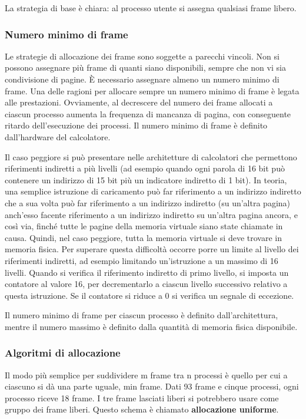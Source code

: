 \documentclass[11pt,a4paper]{article}
\begin{document}
La strategia di base è chiara: al processo utente si assegna qualsiasi frame libero.

\subsubsection{Numero minimo di frame}
Le strategie di allocazione dei frame sono soggette a parecchi vincoli. Non si possono asse­gnare più frame di quanti siano disponibili, sempre che non vi sia condivisione di pagine. È necessario assegnare almeno un numero minimo di frame.
Una delle ragioni per allocare sempre un numero minimo di frame è legata alle presta­zioni. Ovviamente, al decrescere del numero dei frame allocati a ciascun processo aumenta la frequenza di mancanza di pagina, con conseguente ritardo dell'esecuzione dei processi.
Il numero minimo di frame è definito dall'hardware del calcolatore.

Il caso peggiore si può presentare nelle architetture di calcolatori che permettono rife­rimenti indiretti a più livelli (ad esempio quando ogni parola di 16 bit può contenere un in­dirizzo di 15 bit più un indicatore indiretto di 1 bit). In teoria, una semplice istruzione di caricamento può far riferimento a un indirizzo indiretto che a sua volta può far riferimento
a un indirizzo indiretto (su un'altra pagina) anch'esso facente riferimento a un indirizzo in­diretto su un'altra pagina ancora, e così via, finché tutte le pagine della memoria virtuale sia­no state chiamate in causa. Quindi, nel caso peggiore, tutta la memoria virtuale si deve tro­vare in memoria fisica. Per superare questa difficoltà occorre porre un limite al livello dei ri­ferimenti indiretti, ad esempio limitando un'istruzione a un massimo di 16 livelli. Quando
si verifica il riferimento indiretto di primo livello, si imposta un contatore al valore 16, per
decrementarlo a ciascun livello successivo relativo a questa istruzione. Se il contatore si ri­duce a 0 si verifica un segnale di eccezione.

Il numero minimo di frame per ciascun processo è definito dall'architettura, mentre il
numero massimo è definito dalla quantità di memoria fisica disponibile.

\subsubsection{Algoritmi di allocazione}
Il modo più semplice per suddividere m frame tra n processi è quello per cui a ciascuno si dà
una parte uguale, min frame. Dati 93 frame e cinque processi, ogni processo riceve 18 fra­me. I tre frame lasciati liberi si potrebbero usare come gruppo dei frame liberi. Questo schema è chiamato \textbf{allocazione uniforme}.
\end{document}
